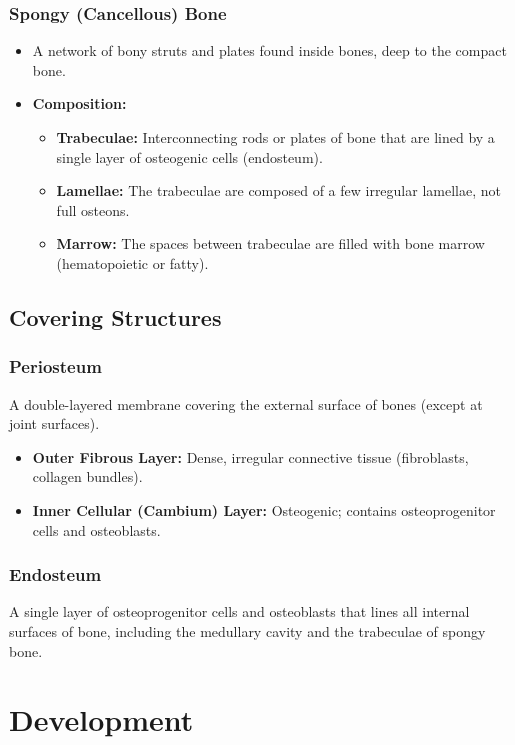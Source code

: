 \documentclass[11pt]{article}
\begin{document}
\subsubsection*{Spongy (Cancellous) Bone}
\begin{itemize}
    \item A network of bony struts and plates found inside bones, deep to the compact bone.
    \item \textbf{Composition:}
    \begin{itemize}
        \item \textbf{Trabeculae:} Interconnecting rods or plates of bone that are lined by a single layer of osteogenic cells (endosteum).
        \item \textbf{Lamellae:} The trabeculae are composed of a few irregular lamellae, not full osteons.
        \item \textbf{Marrow:} The spaces between trabeculae are filled with bone marrow (hematopoietic or fatty).
    \end{itemize}
\end{itemize}

\subsection{Covering Structures}

\subsubsection*{Periosteum}
A double-layered membrane covering the external surface of bones (except at joint surfaces).
\begin{itemize}
    \item \textbf{Outer Fibrous Layer:} Dense, irregular connective tissue (fibroblasts, collagen bundles).
    \item \textbf{Inner Cellular (Cambium) Layer:} Osteogenic; contains osteoprogenitor cells and osteoblasts.
\end{itemize}

\subsubsection*{Endosteum}
A single layer of osteoprogenitor cells and osteoblasts that lines all internal surfaces of bone, including the medullary cavity and the trabeculae of spongy bone.

\section{Development}
\end{document}
